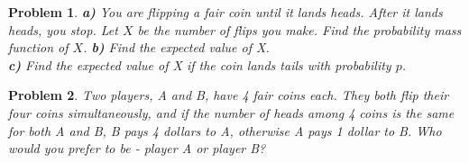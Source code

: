 \documentclass[a4paper,12pt]{article}
\theoremstyle{perfect}
\newtheorem{prb}{Problem}
\begin{document}
\begin{prb}
\textbf{a)} You are flipping a fair coin until it lands heads. After it lands heads, you stop. Let $X$ be the number of flips you make. Find the probability mass function of $X$. 
\newline
\textbf{b)} Find the expected value of X.  \\
\textbf{c)} Find the expected value of X if the coin lands tails with probability $p$.
\end{prb}

\begin{prb}
Two players, A and B, have 4 fair coins each. They both flip their four coins simultaneously, and if the number of heads among 4 coins is the same for both A and B, B pays 4 dollars to A, otherwise A pays 1 dollar to B. Who would you prefer to be - player A or player B?
\end{prb}
\end{document}
